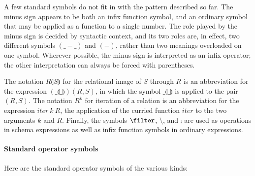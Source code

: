 A few standard symbols do not fit in with the pattern described so
far.  The minus sign appears to be both
an infix function symbol, and an ordinary symbol that may be applied
as a function to a single number. The role played by the minus sign
is decided by syntactic context, and its two roles are, in effect,
two different symbols $(\_ \minus \_)$ and $(\minus)$, rather than
two meanings overloaded on one symbol. Wherever possible, the minus
sign is interpreted as an infix operator; the other interpretation
can always be forced with parentheses.

The notation $R\limg S\rimg$ for the relational
image of $S$ through $R$ is an abbreviation
for the expression $(\_\limg \_\rimg)(R,S)$, in which the symbol
$\_\limg \_\rimg$ is applied to the pair $(R,S)$.  The notation
$R^k$ for iteration of a relation is an
abbreviation for the expression $iter~k~R$, the application of the
curried function $iter$ to the two arguments $k$ and $R$.  Finally,
the symbols $\filter$, $\setminus$, and $\comp$ are used as
operations in schema expressions as well as infix function symbols
in ordinary expressions.

\paragraph{Standard operator symbols}

Here are the standard operator symbols of the various kinds:


